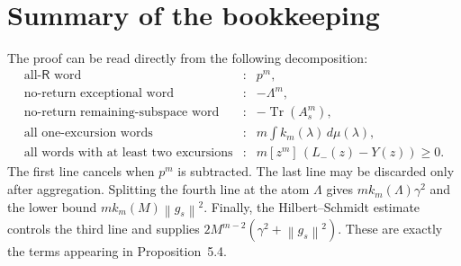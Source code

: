 \documentclass[11pt]{article}
\newcommand{\R}{\mathsf R}
\newcommand{\Tr}{\operatorname{Tr}}
\newcommand{\norm}[1]{\left\lVert #1\right\rVert}
\newcommand{\coeff}[2]{[z^{#1}]\,#2}
\begin{document}
\section{Summary of the bookkeeping}

The proof can be read directly from the following decomposition:
\[
\begin{array}{rcl}
\text{all-$\R$ word}
  &:& p^m,\\[2mm]
\text{no-return exceptional word}
  &:& -\Lambda^m,\\[2mm]
\text{no-return remaining-subspace word}
  &:& -\Tr(A_s^m),\\[2mm]
\text{all one-excursion words}
  &:& m\displaystyle\int k_m(\lambda)\,d\mu(\lambda),\\[3mm]
\text{all words with at least two excursions}
  &:& m\coeff{m}{(L_-(z)-Y(z))}\geq0.
\end{array}
\tag{8.1}
\]
The first line cancels when $p^m$ is subtracted.  The last line may be
discarded only after aggregation.  Splitting the fourth line at the atom
$\Lambda$ gives $mk_m(\Lambda)\gamma^2$ and the lower bound
$mk_m(M)\norm{g_s}^2$.  Finally, the Hilbert--Schmidt estimate controls the
third line and supplies $2M^{m-2}(\gamma^2+\norm{g_s}^2)$.  These are exactly
the terms appearing in Proposition~5.4.
\end{document}
